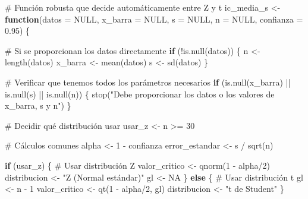 \documentclass[
  spanish,
  letterpaper,
]{book}
\newenvironment{Shaded}{\begin{snugshade}}{\end{snugshade}}
\newcommand{\AttributeTok}[1]{\textcolor[rgb]{0.40,0.45,0.13}{#1}}
\newcommand{\CommentTok}[1]{\textcolor[rgb]{0.37,0.37,0.37}{#1}}
\newcommand{\ConstantTok}[1]{\textcolor[rgb]{0.56,0.35,0.01}{#1}}
\newcommand{\ControlFlowTok}[1]{\textcolor[rgb]{0.00,0.23,0.31}{\textbf{#1}}}
\newcommand{\DecValTok}[1]{\textcolor[rgb]{0.68,0.00,0.00}{#1}}
\newcommand{\FloatTok}[1]{\textcolor[rgb]{0.68,0.00,0.00}{#1}}
\newcommand{\FunctionTok}[1]{\textcolor[rgb]{0.28,0.35,0.67}{#1}}
\newcommand{\NormalTok}[1]{\textcolor[rgb]{0.00,0.23,0.31}{#1}}
\newcommand{\OtherTok}[1]{\textcolor[rgb]{0.00,0.23,0.31}{#1}}
\newcommand{\SpecialCharTok}[1]{\textcolor[rgb]{0.37,0.37,0.37}{#1}}
\newcommand{\StringTok}[1]{\textcolor[rgb]{0.13,0.47,0.30}{#1}}
\begin{document}
\begin{Shaded}
\begin{Highlighting}[]
\CommentTok{\# Función robusta que decide automáticamente entre Z y t}
\NormalTok{ic\_media\_s }\OtherTok{\textless{}{-}} \ControlFlowTok{function}\NormalTok{(}\AttributeTok{datos =} \ConstantTok{NULL}\NormalTok{, }\AttributeTok{x\_barra =} \ConstantTok{NULL}\NormalTok{, }\AttributeTok{s =} \ConstantTok{NULL}\NormalTok{, }\AttributeTok{n =} \ConstantTok{NULL}\NormalTok{, }\AttributeTok{confianza =} \FloatTok{0.95}\NormalTok{) \{}
  
  \CommentTok{\# Si se proporcionan los datos directamente}
  \ControlFlowTok{if}\NormalTok{ (}\SpecialCharTok{!}\FunctionTok{is.null}\NormalTok{(datos)) \{}
\NormalTok{    n }\OtherTok{\textless{}{-}} \FunctionTok{length}\NormalTok{(datos)}
\NormalTok{    x\_barra }\OtherTok{\textless{}{-}} \FunctionTok{mean}\NormalTok{(datos)}
\NormalTok{    s }\OtherTok{\textless{}{-}} \FunctionTok{sd}\NormalTok{(datos)}
\NormalTok{  \}}
  
  \CommentTok{\# Verificar que tenemos todos los parámetros necesarios}
  \ControlFlowTok{if}\NormalTok{ (}\FunctionTok{is.null}\NormalTok{(x\_barra) }\SpecialCharTok{||} \FunctionTok{is.null}\NormalTok{(s) }\SpecialCharTok{||} \FunctionTok{is.null}\NormalTok{(n)) \{}
    \FunctionTok{stop}\NormalTok{(}\StringTok{"Debe proporcionar los datos o los valores de x\_barra, s y n"}\NormalTok{)}
\NormalTok{  \}}
  
  \CommentTok{\# Decidir qué distribución usar}
\NormalTok{  usar\_z }\OtherTok{\textless{}{-}}\NormalTok{ n }\SpecialCharTok{\textgreater{}=} \DecValTok{30}
  
  \CommentTok{\# Cálculos comunes}
\NormalTok{  alpha }\OtherTok{\textless{}{-}} \DecValTok{1} \SpecialCharTok{{-}}\NormalTok{ confianza}
\NormalTok{  error\_estandar }\OtherTok{\textless{}{-}}\NormalTok{ s }\SpecialCharTok{/} \FunctionTok{sqrt}\NormalTok{(n)}
  
  \ControlFlowTok{if}\NormalTok{ (usar\_z) \{}
    \CommentTok{\# Usar distribución Z}
\NormalTok{    valor\_critico }\OtherTok{\textless{}{-}} \FunctionTok{qnorm}\NormalTok{(}\DecValTok{1} \SpecialCharTok{{-}}\NormalTok{ alpha}\SpecialCharTok{/}\DecValTok{2}\NormalTok{)}
\NormalTok{    distribucion }\OtherTok{\textless{}{-}} \StringTok{"Z (Normal estándar)"}
\NormalTok{    gl }\OtherTok{\textless{}{-}} \ConstantTok{NA}
\NormalTok{  \} }\ControlFlowTok{else}\NormalTok{ \{}
    \CommentTok{\# Usar distribución t}
\NormalTok{    gl }\OtherTok{\textless{}{-}}\NormalTok{ n }\SpecialCharTok{{-}} \DecValTok{1}
\NormalTok{    valor\_critico }\OtherTok{\textless{}{-}} \FunctionTok{qt}\NormalTok{(}\DecValTok{1} \SpecialCharTok{{-}}\NormalTok{ alpha}\SpecialCharTok{/}\DecValTok{2}\NormalTok{, gl)}
\NormalTok{    distribucion }\OtherTok{\textless{}{-}} \StringTok{"t de Student"}
\NormalTok{  \}}
  

\end{Highlighting}
\end{Shaded}
\end{document}
